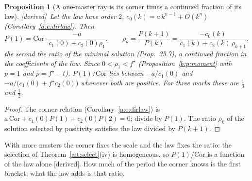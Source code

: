 \documentclass[11pt]{article}
\theoremstyle{plain}
\newtheorem{proposition}{Proposition}[section]
\theoremstyle{definition}
\theoremstyle{remark}
\newcommand{\derived}{\textup{[derived]}}
\begin{document}
\begin{proposition}[A one-master ray is its corner times a continued fraction of its law]\label{b:p:cf}\derived\
Let the law have order $2$, $c_0(k)=a\,k^{n-1}+O(k^n)$ (Corollary~\ref{a:c:dirlaw}). Then
\[
P(1)=\mathrm{Cor}\cdot\frac{-a}{c_1(0)+c_2(0)\rho_1},\qquad \rho_k=\frac{P(k+1)}{P(k)}=\frac{-c_0(k)}{c_1(k)+c_2(k)\,\rho_{k+1}},
\]
the second the ratio of the minimal solution (Prop.~35.7), a continued fraction in the coefficients of the law. Since $0<\rho_1<f^\star$ (Proposition~\ref{b:p:moment} with $p=1$ and $p=f^\star-t$), $P(1)/\mathrm{Cor}$ lies between $-a/c_1(0)$ and $-a/\big(c_1(0)+f^\star c_2(0)\big)$ whenever both are positive. For three marks these are $\frac13$ and $\frac12$.
\end{proposition}

\begin{proof}
The corner relation (Corollary~\ref{a:c:dirlaw}) is $a\,\mathrm{Cor}+c_1(0)P(1)+c_2(0)P(2)=0$; divide by $P(1)$. The ratio $\rho_k$ of the solution selected by positivity satisfies the law divided by $P(k+1)$.
\end{proof}

With more masters the corner fixes the scale and the law fixes the ratio: the selection of Theorem~\ref{a:t:select}(iv) is homogeneous, so $P(1)/\mathrm{Cor}$ is a function of the law alone \derived. How much of the period the corner knows is the first bracket; what the law adds is that ratio.
\end{document}

